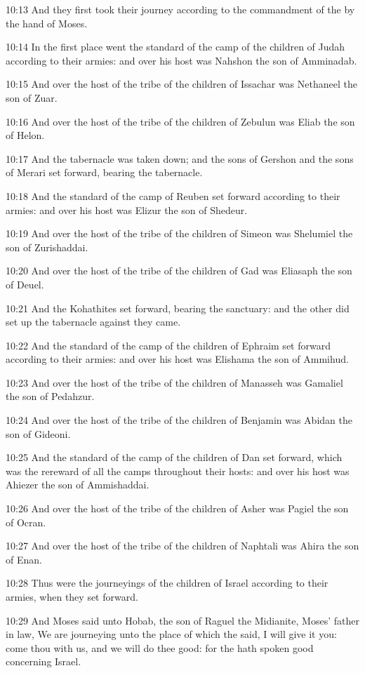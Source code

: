 10:13 And they first took their journey according to the commandment
of the \LORD by the hand of Moses.

10:14 In the first place went the standard of the camp of the children
of Judah according to their armies: and over his host was Nahshon the
son of Amminadab.

10:15 And over the host of the tribe of the children of Issachar was
Nethaneel the son of Zuar.

10:16 And over the host of the tribe of the children of Zebulun was
Eliab the son of Helon.

10:17 And the tabernacle was taken down; and the sons of Gershon and
the sons of Merari set forward, bearing the tabernacle.

10:18 And the standard of the camp of Reuben set forward according to
their armies: and over his host was Elizur the son of Shedeur.

10:19 And over the host of the tribe of the children of Simeon was
Shelumiel the son of Zurishaddai.

10:20 And over the host of the tribe of the children of Gad was
Eliasaph the son of Deuel.

10:21 And the Kohathites set forward, bearing the sanctuary: and the
other did set up the tabernacle against they came.

10:22 And the standard of the camp of the children of Ephraim set
forward according to their armies: and over his host was Elishama the
son of Ammihud.

10:23 And over the host of the tribe of the children of Manasseh was
Gamaliel the son of Pedahzur.

10:24 And over the host of the tribe of the children of Benjamin was
Abidan the son of Gideoni.

10:25 And the standard of the camp of the children of Dan set forward,
which was the rereward of all the camps throughout their hosts: and
over his host was Ahiezer the son of Ammishaddai.

10:26 And over the host of the tribe of the children of Asher was
Pagiel the son of Ocran.

10:27 And over the host of the tribe of the children of Naphtali was
Ahira the son of Enan.

10:28 Thus were the journeyings of the children of Israel according to
their armies, when they set forward.

10:29 And Moses said unto Hobab, the son of Raguel the Midianite,
Moses' father in law, We are journeying unto the place of which the
\LORD said, I will give it you: come thou with us, and we will do thee
good: for the \LORD hath spoken good concerning Israel.

